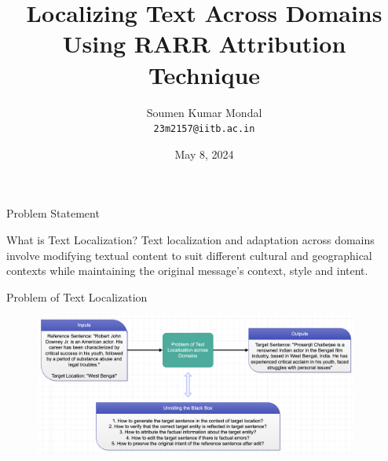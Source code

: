 \documentclass{beamer}
\title[DS 691: RnD Project]{Localizing Text Across Domains Using RARR Attribution Technique}
\author[Soumen Mondal]{Soumen Kumar Mondal\\\texttt{23m2157@iitb.ac.in}}
\institute[IIT Bombay]{Guide: Prof. Preethi Jyothi\\\;\\Indian Institute of Technology Bombay}
\date{May 8, 2024}
\begin{document}
	\begin{frame}
		\titlepage
	\end{frame}
	
	\begin{frame}{Problem Statement}
		\begin{block}{\scriptsize What is Text Localization?}\scriptsize
			Text localization and adaptation across domains involve modifying textual content to suit different cultural and geographical contexts while maintaining the original message's context, style and intent.
		\end{block}
		\begin{block}{\scriptsize Problem of Text Localization}\scriptsize
			\begin{figure}
				\centering
				\includegraphics[width=0.95\textwidth]{problem-statement.png}
			\end{figure}
		\end{block}
	\end{frame}
	
\end{document}
